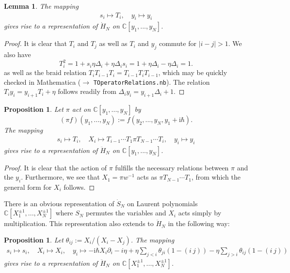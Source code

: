 \documentclass[11pt]{report}
\newtheorem{lemma}[theorem]{Lemma}
\newtheorem{prop}[theorem]{Proposition}
\theoremstyle{definition}
\theoremstyle{remark}
\theoremstyle{remark}
\newcommand{\C}{\mathbb{C}}
\newcommand{\I}{\mathrm{i}}
\begin{document}
\begin{lemma}
The mapping
\begin{align*}
s_i \mapsto T_i, \quad y_i \mapsto y_i
\end{align*}
gives rise to a representation of $\dot H_N$ on $\C[y_1,...,y_N]$.
\end{lemma}

\begin{proof}
It is clear that $T_i$ and $T_j$ as well as $T_i$ and $y_j$ commute for $|i-j|>1$. We also have
\begin{equation*}
T_i^2 = 1 + s_i \eta \Delta_i + \eta \Delta_i s_i = 1 + \eta \Delta_i - \eta \Delta_i = 1.
\end{equation*}
as well as the braid relation $T_i T_{i-1} T_i = T_{i-1} T_i T_{i-1}$, which may be quickly checked in Mathematica ($\to$ \texttt{TOperatorRelations.nb}). The relation $T_i y_i = y_{i+1} T_i + \eta$ follows readily from $\Delta_i y_i = y_{i+1} \Delta_i + 1$.
\end{proof}

\begin{prop}
Let $\pi$ act on $\C[y_1,...,y_N]$ by
\begin{equation*}
(\pi f)(y_1,...,y_N) := f(y_2,...,y_N,y_1 + \I \hbar).
\end{equation*}
The mapping
\begin{align*}
s_i \mapsto T_i, \quad X_i \mapsto T_{i-1} \cdots T_1 \pi T_{N-1} \cdots T_i, \quad y_i \mapsto y_i
\end{align*}
gives rise to a representation of $\ddot H_N$ on $\C[y_1,...,y_N]$.
\end{prop}

\begin{proof}
It is clear that the action of $\pi$ fulfills the necessary relations between $\pi$ and the $y_i$. Furthermore, we see that $X_1 = \pi w^{-1}$ acts as $\pi T_{N-1} \cdots T_1$, from which the general form for $X_i$ follows.
\end{proof}

There is an obvious representation of $\dot S_N$ on Laurent polynomials $\C[X_1^{\pm 1},...,X_N^{\pm 1}]$ where $S_N$ permutes the variables and $X_i$ acts simply by multiplication. This representation also extends to $\ddot H_N$ in the following way:

\begin{prop}\label{prop:trigCMRepresentation}
Let $\theta_{ij} := X_i/(X_i-X_j)$. The mapping
\begin{align*}
s_i \mapsto s_i, \quad X_i \mapsto X_i, \quad y_i \mapsto -\I \hbar X_i \partial_i - i \eta + \eta \sum_{j < i} \theta_{ji} (1-(i \ j)) - \eta \sum_{j > i} \theta_{ij} (1-(i \ j))
\end{align*}
gives rise to a representation of $\ddot H_N$ on $\C[X_1^{\pm 1},...,X_N^{\pm 1}]$.
\end{prop}
\end{document}
